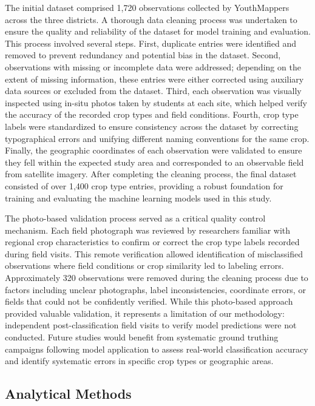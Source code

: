 \documentclass[
  journal,
  twocolumn]{IEEEtran}
\begin{document}
The initial dataset comprised 1,720 observations collected by
YouthMappers across the three districts. A thorough data cleaning
process was undertaken to ensure the quality and reliability of the
dataset for model training and evaluation. This process involved several
steps. First, duplicate entries were identified and removed to prevent
redundancy and potential bias in the dataset. Second, observations with
missing or incomplete data were addressed; depending on the extent of
missing information, these entries were either corrected using auxiliary
data sources or excluded from the dataset. Third, each observation was
visually inspected using in-situ photos taken by students at each site,
which helped verify the accuracy of the recorded crop types and field
conditions. Fourth, crop type labels were standardized to ensure
consistency across the dataset by correcting typographical errors and
unifying different naming conventions for the same crop. Finally, the
geographic coordinates of each observation were validated to ensure they
fell within the expected study area and corresponded to an observable
field from satellite imagery. After completing the cleaning process, the
final dataset consisted of over 1,400 crop type entries, providing a
robust foundation for training and evaluating the machine learning
models used in this study.

The photo-based validation process served as a critical quality control
mechanism. Each field photograph was reviewed by researchers familiar
with regional crop characteristics to confirm or correct the crop type
labels recorded during field visits. This remote verification allowed
identification of misclassified observations where field conditions or
crop similarity led to labeling errors. Approximately 320 observations
were removed during the cleaning process due to factors including
unclear photographs, label inconsistencies, coordinate errors, or fields
that could not be confidently verified. While this photo-based approach
provided valuable validation, it represents a limitation of our
methodology: independent post-classification field visits to verify
model predictions were not conducted. Future studies would benefit from
systematic ground truthing campaigns following model application to
assess real-world classification accuracy and identify systematic errors
in specific crop types or geographic areas.

\hypertarget{analytical-methods}{%
\subsection{Analytical Methods}\label{analytical-methods}}
\end{document}
